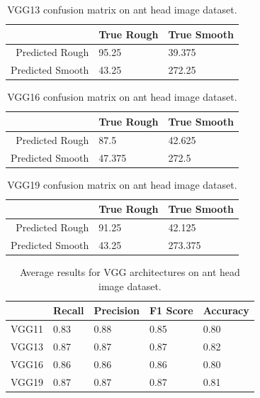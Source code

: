 \documentclass[12pt]{article}
\begin{document}
\vspace{0.5in}

\begin{table}[h]
    \centering
    \caption{VGG13 confusion matrix on ant head image dataset.}
    \begin{tabular}{r|ll}
                         & True Rough & True Smooth \\
        \hline
        Predicted Rough  & 95.25      & 39.375      \\
        Predicted Smooth & 43.25      & 272.25      \\
    \end{tabular}
    \label{tab:vgg13_confusion_matrix}
\end{table}

\vspace{0.5in}

\begin{table}[h]
    \centering
    \caption{VGG16 confusion matrix on ant head image dataset.}
    \begin{tabular}{r|ll}
                         & True Rough & True Smooth \\
        \hline
        Predicted Rough  & 87.5       & 42.625      \\
        Predicted Smooth & 47.375     & 272.5       \\
    \end{tabular}
    \label{tab:vgg16_confusion_matrix}
\end{table}

\vspace{0.5in}

\begin{table}[h]
    \centering
    \caption{VGG19 confusion matrix on ant head image dataset.}
    \begin{tabular}{r|ll}
                         & True Rough & True Smooth \\
        \hline
        Predicted Rough  & 91.25      & 42.125      \\
        Predicted Smooth & 43.25      & 273.375     \\
    \end{tabular}
    \label{tab:vgg19_confusion_matrix}
\end{table}

\vspace{0.5in}

\begin{table}[h]
    \centering
    \caption{Average results for VGG architectures on ant head image dataset.}
    \begin{tabular}{r|llll}
              & Recall & Precision & F1 Score & Accuracy \\
        \hline
        VGG11 & 0.83   & 0.88      & 0.85     & 0.80     \\
        VGG13 & 0.87   & 0.87      & 0.87     & 0.82     \\
        VGG16 & 0.86   & 0.86      & 0.86     & 0.80     \\
        VGG19 & 0.87   & 0.87      & 0.87     & 0.81     \\
    \end{tabular}
    \label{tab:vgg_results}
\end{table}
\end{document}
